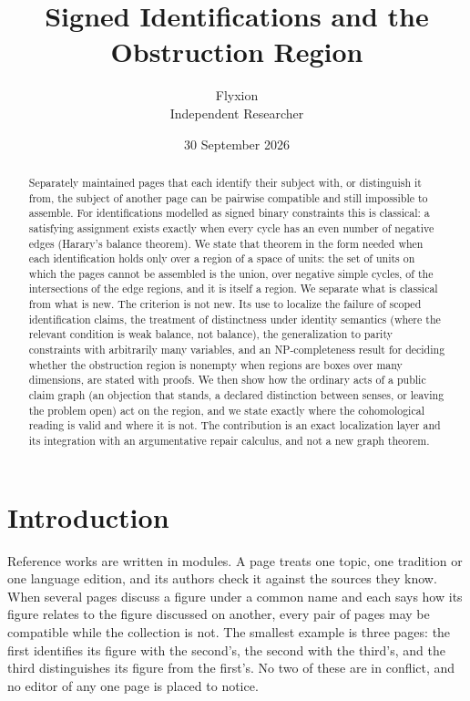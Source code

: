 \documentclass[11pt]{article}
\title{Signed Identifications and the Obstruction Region}
\author{Flyxion\\\small Independent Researcher}
\date{30 September 2026}
\theoremstyle{plain}
\theoremstyle{definition}
\theoremstyle{remark}
\begin{document}
\maketitle

\begin{abstract}
\noindent
Separately maintained pages that each identify their subject with, or distinguish it from, the subject of another page can be pairwise compatible and still impossible to assemble. For identifications modelled as signed binary constraints this is classical: a satisfying assignment exists exactly when every cycle has an even number of negative edges (Harary's balance theorem). We state that theorem in the form needed when each identification holds only over a region of a space of units: the set of units on which the pages cannot be assembled is the union, over negative simple cycles, of the intersections of the edge regions, and it is itself a region. We separate what is classical from what is new. The criterion is not new. Its use to localize the failure of scoped identification claims, the treatment of distinctness under identity semantics (where the relevant condition is weak balance, not balance), the generalization to parity constraints with arbitrarily many variables, and an NP-completeness result for deciding whether the obstruction region is nonempty when regions are boxes over many dimensions, are stated with proofs. We then show how the ordinary acts of a public claim graph (an objection that stands, a declared distinction between senses, or leaving the problem open) act on the region, and we state exactly where the cohomological reading is valid and where it is not. The contribution is an exact localization layer and its integration with an argumentative repair calculus, and not a new graph theorem.
\end{abstract}

\section{Introduction}\label{sec:intro}

Reference works are written in modules. A page treats one topic, one tradition or one language edition, and its authors check it against the sources they know. When several pages discuss a figure under a common name and each says how its figure relates to the figure discussed on another, every pair of pages may be compatible while the collection is not. The smallest example is three pages: the first identifies its figure with the second's, the second with the third's, and the third distinguishes its figure from the first's. No two of these are in conflict, and no editor of any one page is placed to notice.
\end{document}
